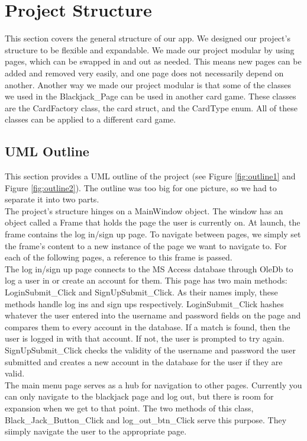 \documentclass[10pt,conference,onecolumn,compsoc]{IEEEtran}
\begin{document}
\section{Project Structure}
\noindent
This section covers the general structure of our app. We designed our project's structure to be flexible and expandable. We made our project modular by using pages, which can be swapped in and out as needed. This means new pages can be added and removed very easily, and one page does not necessarily depend on another. Another way we made our project modular is that some of the classes we used in the Blackjack\_Page can be used in another card game. These classes are the CardFactory class, the card struct, and the CardType enum. All of these classes can be applied to a different card game.

\subsection{UML Outline}
\noindent
This section provides a UML outline of the project (see Figure \ref{fig:outline1} and Figure \ref{fig:outline2}). The outline was too big for one picture, so we had to separate it into two parts.\\
\newline
The project's structure hinges on a MainWindow object. The window has an object called a Frame that holds the page the user is currently on. At launch, the frame contains the log in/sign up page. To navigate between pages, we simply set the frame's content to a new instance of the page we want to navigate to. For each of the following pages, a reference to this frame is passed.\\
\newline
The log in/sign up page connects to the MS Access database through OleDb to log a user in or create an account for them. This page has two main methods: LoginSubmit\_Click and SignUpSubmit\_Click. As their names imply, these methods handle log ins and sign ups respectively.  LoginSubmit\_Click hashes whatever the user entered into the username and password fields on the page and compares them to every account in the database. If a match is found, then the user is logged in with that account. If not, the user is prompted to try again. SignUpSubmit\_Click
checks the validity of the username and password the user submitted and creates a new account in the database for the user if they are valid.\\
\newline
The main menu page serves as a hub for navigation to other pages. Currently you can only navigate to the blackjack page and log out, but there is room for expansion when we get to that point. The two methods of this class, Black\_Jack\_Button\_Click and log\_out\_btn\_Click serve this purpose. They siimply navigate the user to the appropriate page.\\
\end{document}
